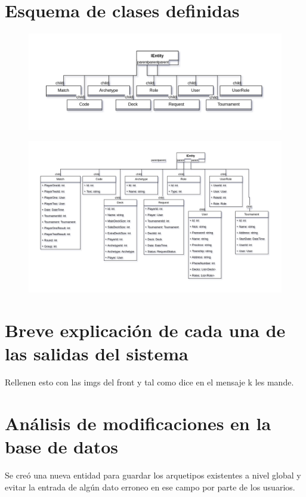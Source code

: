 \documentclass[a4paper]{article}
\begin{document}
\newpage
\section{Esquema de clases definidas}
	\begin{figure}[h]
  		\includegraphics[width=1\textwidth]{ClasesDefinidas.png} 
	\end{figure}
	\begin{figure}[h]
  		\includegraphics[width=1\textwidth]{ClasesDefinidasExtendido.png} 
	\end{figure}

\newpage
\section{Breve explicaci\'on de cada una de las salidas del sistema}
Rellenen esto con las imgs del front y tal como dice en el mensaje k les mande.

\newpage
\section{An\'alisis de modificaciones en la base de datos}
Se cre\'o una nueva entidad para guardar los arquetipos existentes a nivel global y evitar la entrada de alg\'un dato erroneo en ese campo por parte de los usuarios.
\end{document}
